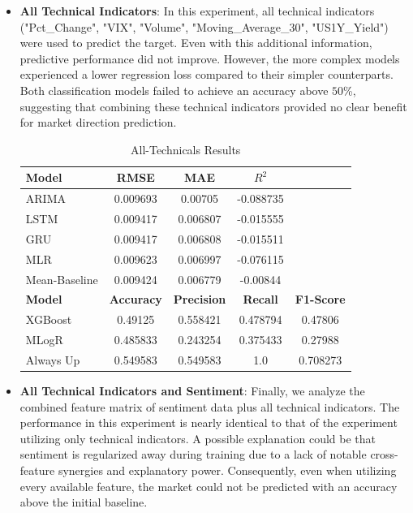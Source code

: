 \documentclass[Master,english,IEEE]{twbook}
\begin{document}
\begin{itemize}
    \item \textbf{All Technical Indicators}: In this experiment, all technical indicators ("Pct\_Change", "VIX", "Volume", "Moving\_Average\_30", "US1Y\_Yield") were used to predict the target. Even with this additional information, predictive performance did not improve. However, the more complex models experienced a lower regression loss compared to their simpler counterparts. Both classification models failed to achieve an accuracy above $50$\%, suggesting that combining these technical indicators provided no clear benefit for market direction prediction.
    \begin{table}[H]
    \centering
    \small %
    \setlength{\tabcolsep}{4pt} %
    \begin{tabular}{|lcccc|}
        \hline
        \textbf{Model} & \textbf{RMSE} & \textbf{MAE} & \textbf{$R^2$} & \\
        \hline
        ARIMA          & 0.009693      & 0.00705      & -0.088735      & \\
        LSTM           & 0.009417      & 0.006807     & -0.015555      & \\
        GRU            & 0.009417      & 0.006808     & -0.015511      & \\
        MLR            & 0.009623      & 0.006997     & -0.076115      & \\
        Mean-Baseline  & 0.009424      & 0.006779     & -0.00844       & \\
        \hline
        \textbf{Model} & \textbf{Accuracy} & \textbf{Precision} & \textbf{Recall} & \textbf{F1-Score} \\
        \hline
        XGBoost        & 0.49125       & 0.558421     & 0.478794       & 0.47806  \\
        MLogR          & 0.485833      & 0.243254     & 0.375433       & 0.27988  \\
        Always Up      & 0.549583      & 0.549583     & 1.0            & 0.708273 \\
        \hline
    \end{tabular}
    \caption{All-Technicals Results}
    \label{tab:res_all_technicals}
    \end{table}
    \item \textbf{All Technical Indicators and Sentiment}: Finally, we analyze the combined feature matrix of sentiment data plus all technical indicators. The performance in this experiment is nearly identical to that of the experiment utilizing only technical indicators. A possible explanation could be that sentiment is regularized away during training due to a lack of notable cross-feature synergies and explanatory power. Consequently, even when utilizing every available feature, the market could not be predicted with an accuracy above the initial baseline.

\end{itemize}
\end{document}

